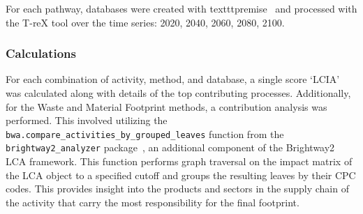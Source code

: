 For each pathway, databases were created with texttt{premise}~\citep{sacchi2022premise} and processed with the T-reX tool over the time series: 2020, 2040, 2060, 2080, 2100.

\subsubsection{Calculations}
For each combination of activity, method, and database, a single score `LCIA' was calculated along with details of the top contributing processes. Additionally, for the Waste and Material Footprint methods, a contribution analysis was performed. This involved utilizing the \texttt{bwa.compare\_activities\_by\_grouped\_leaves} function from the \texttt{brightway2\_analyzer} package~\cite{mutel2016brightway2analyzer}, an additional component of the Brightway2 LCA framework. This function performs graph traversal on the impact matrix of the LCA object to a specified cutoff and groups the resulting leaves by their CPC codes. This provides insight into the products and sectors in the supply chain of the activity that carry the most responsibility for the final footprint.


